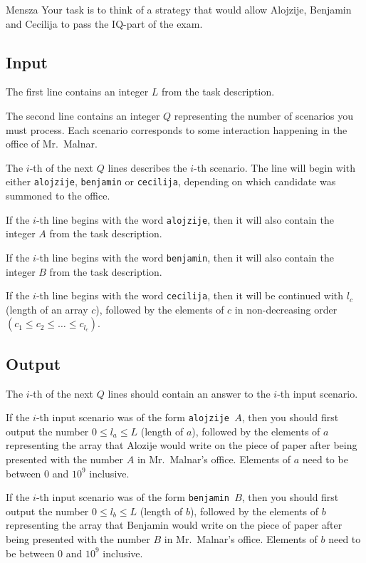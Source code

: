 \begin{statement}[
  problempoints=100,
  timelimit=5 seconds,
  memorylimit=512 MiB,
]{Mensza}
Your task is to think of a strategy that would allow Alojzije, Benjamin and
Cecilija to pass the IQ-part of the exam.

\subsection*{Input}
The first line contains an integer $L$ from the task description.

The second line contains an integer $Q$ representing the number of scenarios
you must process. Each scenario corresponds to some interaction happening in
the office of Mr.\ Malnar.

The $i$-th of the next $Q$ lines describes the $i$-th scenario. The line will
begin with either \texttt{alojzije}, \texttt{benjamin} or \texttt{cecilija},
depending on which candidate was summoned to the office.

If the $i$-th line begins with the word \texttt{alojzije}, then it will also
contain the integer $A$ from the task description.

If the $i$-th line begins with the word \texttt{benjamin}, then it will also
contain the integer $B$ from the task description.

If the $i$-th line begins with the word \texttt{cecilija}, then it will be
continued with $l_c$ (length of an array $c$), followed by the elements of
$c$ in non-decreasing order $(c_1 \le c_2 \le \ldots \le c_{l_c})$.

\clearpage

\subsection*{Output}
The $i$-th of the next $Q$ lines should contain an answer to the $i$-th
input scenario.

If the $i$-th input scenario was of the form \texttt{alojzije $A$}, then you
should first output the number $0 \le l_a \le L$ (length of $a$), followed by
the elements of $a$ representing the array that Alozije would write on the
piece of paper after being presented with the number $A$ in Mr.\ Malnar's office.
Elements of $a$ need to be between $0$ and $10^9$ inclusive.

If the $i$-th input scenario was of the form \texttt{benjamin $B$}, then you
should first output the number $0 \le l_b \le L$ (length of $b$), followed by
the elements of $b$ representing the array that Benjamin would write on the
piece of paper after being presented with the number $B$ in Mr.\ Malnar's office.
Elements of $b$ need to be between $0$ and $10^9$ inclusive.


\end{statement}

